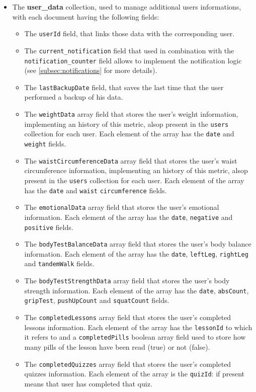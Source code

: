 \begin{itemize}[nosep] %
    \item The \textbf{user\_data} collection, used to manage additional users informations, with each document having the following fields:
    \begin{itemize}[nosep]
        \item The \texttt{userId} field, that links those data with the corresponding user.
        \item The \texttt{current\_notification} field that used in combination with the \newline \texttt{notification\_counter} field allows to implement the notification logic (see \cref{subsec:notifications} for more details).
        \item The \texttt{lastBackupDate} field, that saves the last time that the user performed a backup of his data.
        \item The \texttt{weightData} array field that stores the user's weight information, implementing an history of this metric, alsop present in the \texttt{users} collection for each user. Each element of the array has the \texttt{date} and \texttt{weight} fields.    
        \item The \texttt{waistCircumferenceData} array field that stores the user's waist circumference information, implementing an history of this metric, alsop present in the \texttt{users} collection for each user. Each element of the array has the \texttt{date} and \texttt{waist} \newline \texttt{circumference} fields.
        \item The \texttt{emotionalData} array field that stores the user's emotional information. Each element of the array has the \texttt{date}, \texttt{negative} and \texttt{positive} fields.
        \item The \texttt{bodyTestBalanceData} array field that stores the user's body balance information. Each element of the array has the \texttt{date}, \texttt{leftLeg}, \texttt{rightLeg} and \texttt{tandemWalk} fields.
        \item The \texttt{bodyTestStrengthData} array field that stores the user's body strength information. Each element of the array has the \texttt{date}, \texttt{absCount}, \texttt{gripTest}, \texttt{pushUpCount} and \texttt{squatCount} fields.
        \label{subsubsec:completedPills}
        \item The \texttt{completedLessons} array field that stores the user's completed lessons information. Each element of the array has the \texttt{lessonId} to which it refers to and a \texttt{completedPills} boolean array field used to store how many pills of the lesson have been read (true) or not (false).
        \item The \texttt{completedQuizzes} array field that stores the user's completed quizzes information. Each element of the array is the \texttt{quizId}: if present means that user has completed that quiz.
    \end{itemize}
\end{itemize}

